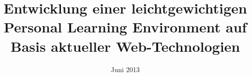 \documentclass[a4paper, 11pt, oneside]{Thesis}  %
\begin{document}
\frontmatter	  %

\title  {Entwicklung einer leichtgewichtigen Personal Learning Environment auf Basis aktueller Web-Technologien}
\addresses  {\groupname\\\deptname\\\univname}  %
\date       {Juni 2013}
\subject    {}
\keywords   {}


\maketitle


\fancyhead{}  %
\rhead{\thepage}  %
\lhead{}  %

\pagestyle{fancy}  %






\end{document}
